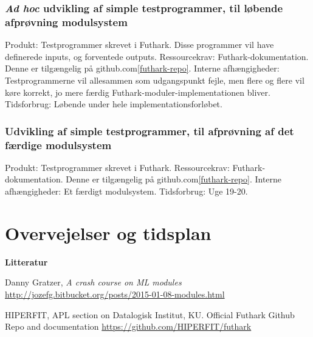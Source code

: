 \documentclass[12pt]{article}
\begin{document}
\subsubsection{\textit{Ad hoc} udvikling af simple testprogrammer, til løbende afprøvning 
modulsystem}
Produkt: Testprogrammer skrevet i Futhark. Disse programmer vil have definerede
inputs, og forventede outputs.
Ressourcekrav: Futhark-dokumentation. Denne er tilgængelig på github.com\ref{futhark-repo}.
Interne afhængigheder: Testprogrammerne vil allesammen som udgangspunkt fejle,
men flere og flere vil køre korrekt, jo mere færdig Futhark-moduler-implementationen bliver.
Tidsforbrug: Løbende under hele implementationsforløbet.

\subsubsection{Udvikling af simple testprogrammer, til afprøvning 
af det færdige modulsystem}
Produkt: Testprogrammer skrevet i Futhark.
Ressourcekrav: Futhark-dokumentation. Denne er tilgængelig på github.com\ref{futhark-repo}.
Interne afhængigheder: Et færdigt modulsystem.
Tidsforbrug: Uge 19-20.

\section{Overvejelser og tidsplan}
\textbf{Litteratur}
\begin{thebibliography}

Danny Gratzer, \textit{A crash course on ML modules}
\url{http://jozefg.bitbucket.org/posts/2015-01-08-modules.html}

HIPERFIT, APL section on Datalogisk Institut, KU.
Official Futhark Github Repo and documentation
\url{https://github.com/HIPERFIT/futhark}
\end{thebibliography}
\end{document}
